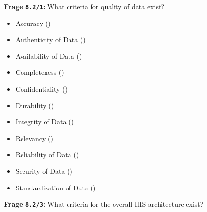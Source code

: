 \textbf{Frage \texttt{8.2/1}:} What criteria for quality of data exist?

\begin{itemize}
  \item Accuracy ()
  \item Authenticity of Data ()
  \item Availability of Data ()
  \item Completeness ()
  \item Confidentiality ()
  \item Durability ()
  \item Integrity of Data ()
  \item Relevancy ()
  \item Reliability of Data ()
  \item Security of Data ()
  \item Standardization of Data ()
\end{itemize}

\textbf{Frage \texttt{8.2/3}:} What criteria for the overall HIS architecture exist?

